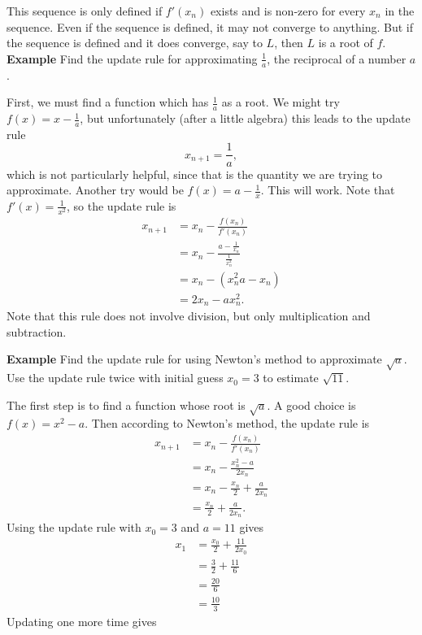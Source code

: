 \documentclass[twoside,openright,titlepage,a4paper]{book}
\begin{document}
\begin{sloppypar}
This sequence is only defined if $f'(x_n)$ exists and is non-zero for every $x_n$ in the sequence. Even if the sequence is defined, it may not converge to anything. But if the sequence is defined and it does converge, say to $L$, then $L$ is a root of $f$.
\bigbreak
\textbf{Example} Find the update rule for approximating $\frac{1}{a}$, the reciprocal of a number $a$.
\begin{examplebox}
First, we must find a function which has $\frac{1}{a}$ as a root. We might try $f(x) = x-\frac{1}{a}$, but unfortunately (after a little algebra) this leads to the update rule \[ x_{n+1} = \frac{1}{a}, \] which is not particularly helpful, since that is the quantity we are trying to approximate.
Another try would be $f(x) = a- \frac{1}{x}$. This will work. Note that $f'(x) = \frac{1}{x^2}$, so the update rule is
\begin{align*}
x_{n+1} &= x_n - \frac{f(x_n)}{f'(x_n)} \\
&= x_n - \frac{a-\frac{1}{x_n}}{\frac{1}{x_n^2}} \\
&= x_n - \left(x_n^2 a - x_n\right) \\
&= 2x_n - a x_n^2.
\end{align*}
Note that this rule does not involve division, but only multiplication and subtraction.	
\end{examplebox}	
\bigbreak
\textbf{Example} Find the update rule for using Newton's method to approximate $\sqrt{a}$. Use the update rule twice with initial guess $x_0 = 3$ to estimate $\sqrt{11}$.
\begin{examplebox}
The first step is to find a function whose root is $\sqrt{a}$. A good choice is $f(x) = x^2-a$. Then according to Newton's method, the update rule is
\begin{align*}
x_{n+1} &= x_n - \frac{f(x_n)}{f'(x_n)} \\
&= x_n - \frac{x_n^2-a}{2x_n} \\
&= x_n - \frac{x_n}{2} + \frac{a}{2x_n} \\
&= \frac{x_n}{2} + \frac{a}{2x_n}.
\end{align*}
Using the update rule with $x_0 = 3$ and $a = 11$ gives
\begin{align*}
x_1 &= \frac{x_0}{2} + \frac{11}{2x_0} \\
&= \frac{3}{2} + \frac{11}{6} \\
&= \frac{20}{6} \\
&= \frac{10}{3}
\end{align*}
Updating one more time gives
\begin{align*} 

\end{align*}
\end{examplebox}
\end{sloppypar}
\end{document}
